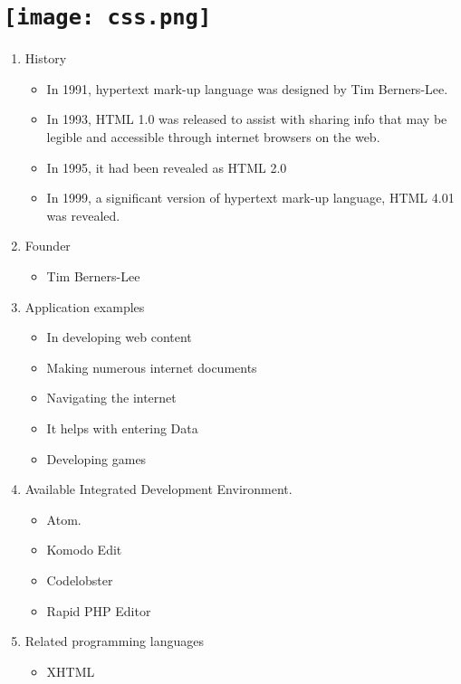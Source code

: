 \section{\texttt{[image: css.png]}}



\begin{frame}
	
	
	\begin{enumerate}
		\item History
		\begin{itemize}
			\item In 1991, hypertext mark-up language was designed by Tim Berners-Lee.
			\item In 1993, HTML 1.0 was released to assist with sharing info that may be legible and accessible through internet browsers on the web.
			\item In 1995, it had been revealed as HTML 2.0
			\item In 1999, a significant version of hypertext mark-up language, HTML 4.01 was revealed.
		\end{itemize}
		\item Founder
		\begin{itemize}
			\item Tim Berners-Lee
		\end{itemize}
		\item Application examples
		\begin{itemize}
			\item In developing web content
			\item Making numerous internet documents
			\item Navigating the internet
			\item It helps with entering Data
			\item Developing games
		\end{itemize}
		\item Available Integrated Development Environment.
		\begin{itemize}
			\item Atom.
			\item Komodo Edit
			\item Codelobster
			\item Rapid PHP Editor
		\end{itemize}
		\item Related programming languages
		\begin{itemize}
			\item XHTML
		\end{itemize}
	\end{enumerate}
	
\end{frame}


